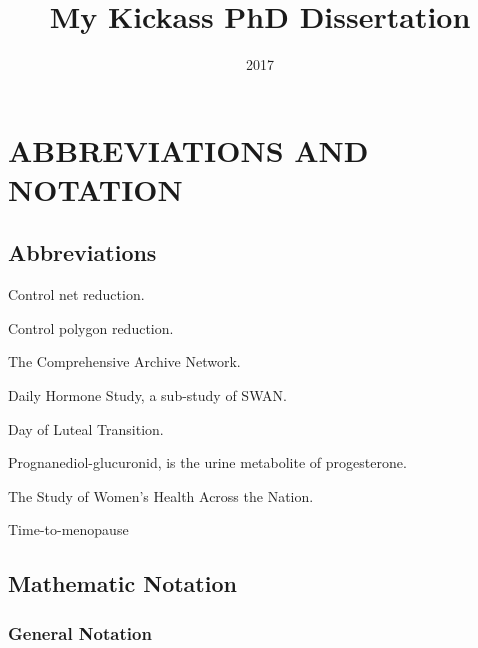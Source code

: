 \documentclass[english,10pt]{ucdenver-dissertation}
\title{My Kickass PhD Dissertation}
\date{2017}
\begin{document}






\renewcommand\bibname{REFERENCES}
\singlespacing

\nocite{*}



\doublespacing

\ucdappendix

\chapter{\uppercase{Abbreviations and Notation} \label{appendix-notation}}

\section{Abbreviations}

\begin{description}[leftmargin=!,labelwidth=0.5in,font=\normalfont]
  \item[CNR]  Control net reduction.
  \item[CPR]  Control polygon reduction.
  \item[CRAN] The Comprehensive  Archive Network.
  \item[DHS]  Daily Hormone Study, a sub-study of SWAN.
  \item[DLT]  Day of Luteal Transition.
  \item[PDG]  Prognanediol-glucuronid, is the urine metabolite of progesterone.
  \item[SWAN] The Study of Women's Health Across the Nation.  
  \item[TTM]  Time-to-menopause
\end{description}

\section{Mathematic Notation}

\subsection{General Notation}
\end{document}
